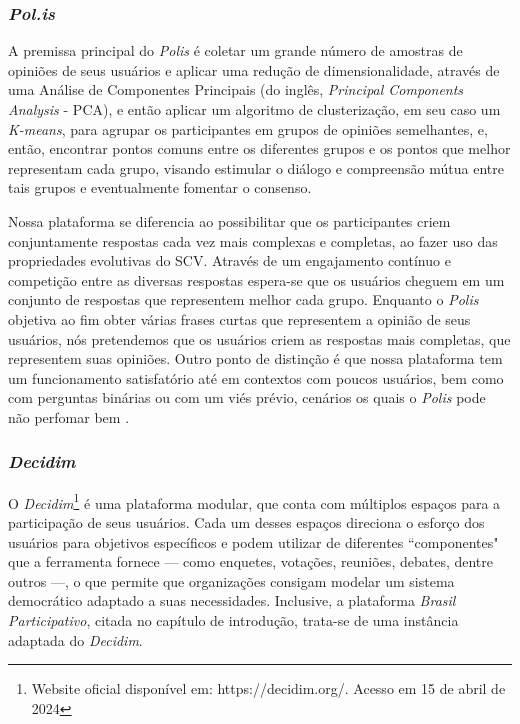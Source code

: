 \subsubsection{\textit{Pol.is}}
A premissa principal do \textit{Polis} é coletar um grande número de amostras de opiniões de seus usuários e aplicar uma redução de dimensionalidade, através de uma Análise de Componentes Principais (do inglês, \textit{Principal Components Analysis} - PCA), e então aplicar um algoritmo de clusterização, em seu caso um \textit{K-means}, para agrupar os participantes em grupos de opiniões semelhantes, e, então, encontrar pontos comuns entre os diferentes grupos e os pontos que melhor representam cada grupo, visando estimular o diálogo e compreensão mútua entre tais grupos e eventualmente fomentar o consenso.

Nossa plataforma se diferencia ao possibilitar que os participantes criem conjuntamente respostas cada vez mais complexas e completas, ao fazer uso das propriedades evolutivas do SCV. Através de um engajamento contínuo e competição entre as diversas respostas espera-se que os usuários cheguem em um conjunto de respostas que representem melhor cada grupo. Enquanto o \textit{Polis} objetiva ao fim obter várias frases curtas que representem a opinião de seus usuários, nós pretendemos que os usuários criem as respostas mais completas, que representem suas opiniões. Outro ponto de distinção é que nossa plataforma tem um funcionamento satisfatório até em contextos com poucos usuários, bem como com perguntas binárias ou com um viés prévio, cenários os quais o \textit{Polis} pode não perfomar bem \cite{polis}.

\subsubsection{\textit{Decidim}}
O \textit{Decidim}\footnote{Website oficial disponível em: https://decidim.org/. Acesso em 15 de abril de 2024} é uma plataforma modular, que conta com múltiplos espaços para a participação de seus usuários. Cada um desses espaços direciona o esforço dos usuários para objetivos específicos e podem utilizar de diferentes “componentes" que a ferramenta fornece — como enquetes, votações, reuniões, debates, dentre outros —, o que permite que organizações consigam modelar um sistema democrático adaptado a suas necessidades. Inclusive, a plataforma \textit{Brasil Participativo}, citada no capítulo de introdução, trata-se de uma instância adaptada do \textit{Decidim}.

